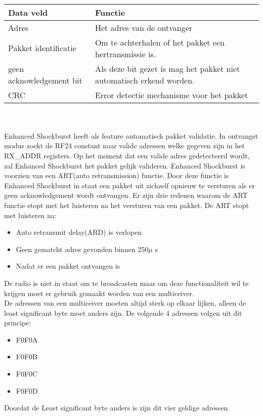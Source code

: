 \documentclass{article}
\begin{document}
\\
\begin{tabular}{ | l | l |}
    \hline
    Data veld					& Functie	\\ \hline
    Adres						& Het adres van de ontvanger	\\ \hline
    Pakket identificatie		& Om te achterhalen of het pakket een hertransmissie is.	\\\hline
    geen acknowledgement bit	&  Als deze bit gezet is mag het pakket niet 									automatisch erkend worden.	\\ \hline
    CRC							&  Error detectie mechanisme voor het pakket			\\ \hline
    \end{tabular}\\
\\

Enhanced Shockburst heeft als feature automatisch pakket validatie. In ontvangst modus zoekt de RF24 constant naar valide adressen welke gegeven zijn in het RX\_ADDR registers. Op het moment dat een valide adres gedetecteerd wordt, zal Enhanced Shockburst het pakket gelijk valideren. Enhanced Shockburst is voorzien van een ART(auto retransmission) functie. Door deze functie is Enhanced Shockburst in staat een pakket uit zichzelf opnieuw te versturen als er geen acknowledgement wordt ontvangen. Er zijn drie redenen waarom de ART functie stopt met het luisteren na het versturen van een pakket. De ART stopt met luisteren na:
\begin{itemize}
	\item Auto retransmit delay(ARD) is verlopen
	\item Geen gematcht adres gevonden binnen 250$\mu$ s
	\item Nadat er een pakket ontvangen is
\end{itemize}
De radio is niet in staat om te broadcasten maar om deze functionaliteit wil te krijgen moet er gebruik gemaakt worden van een multiceiver. 
\\
De adressen van een multiceiver moeten altijd sterk op elkaar lijken, alleen de least significant byte moet anders zijn. De volgende 4 adressen volgen uit dit principe:
\\
\begin{itemize}
	\item  F0F0A
	\item  F0F0B
	\item  F0F0C
	\item  F0F0D
\end{itemize}
Doordat de Least significant byte anders is zijn dit vier geldige adressen.
\\
\end{document}

